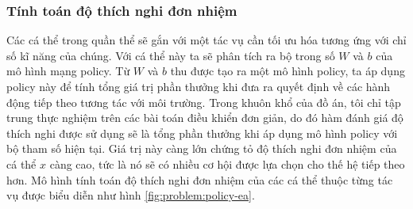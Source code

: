 



\subsubsection{Tính toán độ thích nghi đơn nhiệm}
\label{rl-fitness}


Các cá thể trong quần thể sẽ gắn với một tác vụ cần tối ưu hóa tương ứng với chỉ số kĩ năng của chúng. Với cá thể này ta sẽ phân tích ra bộ trong số $W$ và $b$ của mô hình mạng policy.
Từ $W$ và $b$ thu được tạo ra một mô hình policy, ta áp dụng policy này để tính tổng giá trị phần thưởng khi  đưa ra quyết định về các hành động tiếp theo tương tác với môi trường. Trong khuôn khổ của đồ án, tôi chỉ tập trung thực nghiệm trên các bài toán điều khiển đơn giản, do đó hàm đánh giá độ thích nghi được sử dụng sẽ là tổng phần thưởng khi áp dụng mô hình policy với bộ tham số hiện tại. Giá trị này càng lớn chứng tỏ độ thích nghi đơn nhiệm của cá thể $x$ càng cao, tức là nó sẽ có nhiều cơ hội được lựa chọn cho thế hệ tiếp theo hơn. Mô hình tính toán độ thích nghi đơn nhiệm của các cá thể thuộc từng tác vụ được biểu diễn như hình \ref{fig:problem:policy-ea}.

